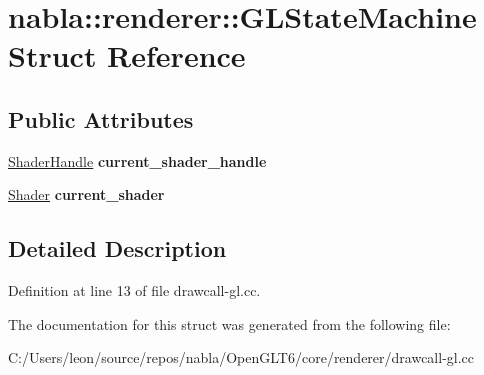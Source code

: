\hypertarget{structnabla_1_1renderer_1_1_g_l_state_machine}{}\section{nabla\+::renderer\+::G\+L\+State\+Machine Struct Reference}
\label{structnabla_1_1renderer_1_1_g_l_state_machine}
\subsection*{Public Attributes}
\begin{DoxyCompactItemize}
\item 
\mbox{\label{structnabla_1_1renderer_1_1_g_l_state_machine_af90abd8958bb9e67f634e8f7cbd5c1f5}} 
\mbox{\hyperlink{classnabla_1_1renderer_1_1_handle}{Shader\+Handle}} {\bfseries current\+\_\+shader\+\_\+handle}
\item 
\mbox{\label{structnabla_1_1renderer_1_1_g_l_state_machine_a13034a0ee4a26608656c9245ad121297}} 
\mbox{\hyperlink{classnabla_1_1renderer_1_1_shader}{Shader}} {\bfseries current\+\_\+shader}
\end{DoxyCompactItemize}


\subsection{Detailed Description}


Definition at line 13 of file drawcall-\/gl.\+cc.



The documentation for this struct was generated from the following file\+:\begin{DoxyCompactItemize}
\item 
C\+:/\+Users/leon/source/repos/nabla/\+Open\+G\+L\+T6/core/renderer/drawcall-\/gl.\+cc\end{DoxyCompactItemize}
